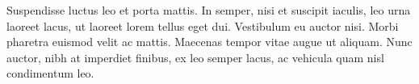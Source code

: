 Suspendisse luctus leo et porta mattis. In semper, nisi et
suscipit iaculis, leo urna laoreet lacus, ut laoreet lorem tellus
eget dui. Vestibulum eu auctor nisi. Morbi pharetra euismod velit
ac mattis. Maecenas tempor vitae augue ut aliquam. Nunc auctor,
nibh at imperdiet finibus, ex leo semper lacus, ac vehicula quam
nisl condimentum leo.